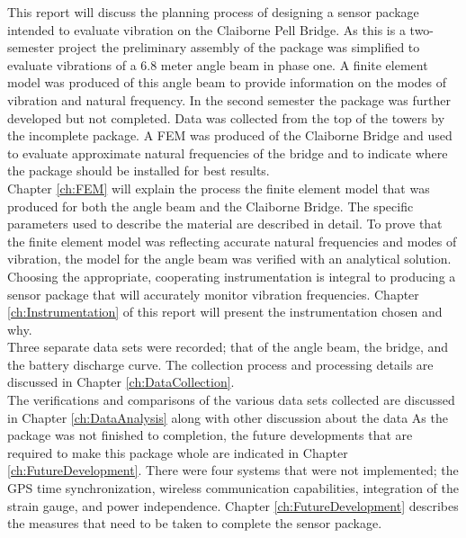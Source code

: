 
\indent This report will discuss the planning process of designing a sensor package intended to evaluate vibration on the Claiborne Pell Bridge. As this is a
two-semester project the preliminary assembly of the package was simplified to evaluate vibrations of a 6.8 meter angle beam in phase one. A finite element
model was produced of this angle beam to provide information on the modes of vibration and natural frequency. In the second semester the package was
further developed but not completed. Data was collected from the top of the towers by the incomplete package. A FEM was produced of the Claiborne Bridge
and used to evaluate approximate natural frequencies of the bridge and to indicate where the package should be installed for best results. \\

\indent Chapter \ref{ch:FEM} will explain the process the finite element model that was produced for both the angle beam and the Claiborne Bridge. The specific
parameters  used to describe the material are described in detail. To prove that the finite element model was reflecting accurate natural frequencies and
modes of vibration, the model for the angle beam was verified with an analytical solution. \\
\indent Choosing the appropriate, cooperating instrumentation is integral to producing a sensor package that will accurately monitor vibration frequencies.
Chapter \ref{ch:Instrumentation} of this report will present the instrumentation chosen and why. \\
\indent Three separate data sets were recorded; that of the angle beam, the bridge, and the battery discharge curve. The collection process and processing
details are discussed in Chapter \ref{ch:DataCollection}. \\ 
\indent The verifications and comparisons of the various data sets collected are discussed in Chapter \ref{ch:DataAnalysis} along with other discussion about the data
\indent As the package was not finished to completion, the future developments that are required to make this package whole are indicated in Chapter \ref{ch:FutureDevelopment}.
There were four systems that were not implemented; the GPS time synchronization, wireless communication capabilities, integration of the strain gauge, and
power independence. Chapter \ref{ch:FutureDevelopment} describes the measures that need to be taken to complete the sensor package.\\